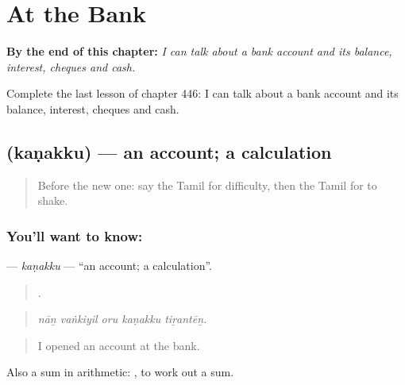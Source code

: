 
\chapter{At the Bank}
\label{ch:ta-at-the-bank}

\begin{chapteropening}
\textbf{By the end of this chapter:} \emph{I can talk about a bank account and its balance, interest, cheques and cash.}

Complete the last lesson of chapter 446: I can talk about a bank account and its balance, interest, cheques and cash.
\end{chapteropening}

\section[\texorpdfstring{\ta{கணக்கு} (kaṇakku)}{கணக்கு (kaṇakku)}]{ (kaṇakku) — an account; a calculation}

\label{lesson:TA-C446-kanakku}



\begin{quote}
Before the new one: say the Tamil for difficulty, then the Tamil for to shake.
\end{quote}

\subsection*{You'll want to know: }
\textbf{} — \emph{kaṇakku} — \textquotedblleft{}an account; a calculation\textquotedblright{}.

\begin{quote}
    .
\end{quote}

\begin{quote}
\emph{nāṉ vaṅkiyil oru kaṇakku tiṟantēṉ.}
\end{quote}

\begin{quote}
I opened an account at the bank.
\end{quote}

Also a sum in arithmetic:  , to work out a sum.

